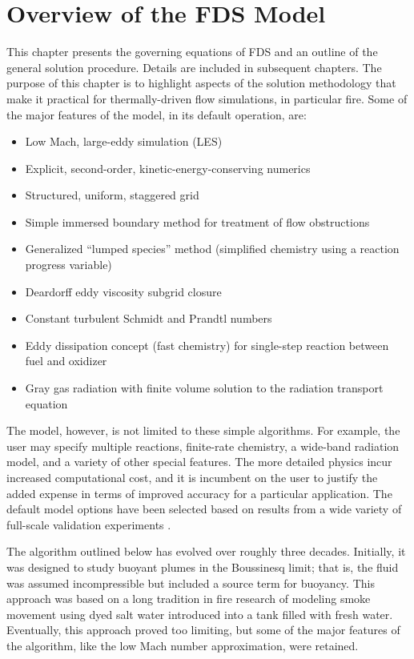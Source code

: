 
\chapter{Overview of the FDS Model}

\label{basisformodel}

This chapter presents the governing equations of FDS and an outline of the general solution procedure. Details are included in subsequent chapters. The purpose of this chapter is to highlight aspects of the solution methodology that make it practical for thermally-driven flow simulations, in particular fire. Some of the major features of the model, in its default operation, are:
\begin{itemize}
\item Low Mach, large-eddy simulation (LES)
\item Explicit, second-order, kinetic-energy-conserving numerics
\item Structured, uniform, staggered grid
\item Simple immersed boundary method for treatment of flow obstructions
\item Generalized ``lumped species'' method (simplified chemistry using a reaction progress variable)
\item Deardorff eddy viscosity subgrid closure
\item Constant turbulent Schmidt and Prandtl numbers
\item Eddy dissipation concept (fast chemistry) for single-step reaction between fuel and oxidizer
\item Gray gas radiation with finite volume solution to the radiation transport equation
\end{itemize}
The model, however, is not limited to these simple algorithms. For example, the user may specify multiple reactions, finite-rate chemistry, a wide-band radiation model, and a variety of other special features. The more detailed physics incur increased computational cost, and it is incumbent on the user to justify the added expense in terms of improved accuracy for a particular application.  The default model options have been selected based on results from a wide variety of full-scale validation experiments \cite{FDS_Validation_Guide}.

The algorithm outlined below has evolved over roughly three decades. Initially, it was designed to study buoyant plumes in the Boussinesq limit; that is, the fluid was assumed incompressible but included a source term for buoyancy. This approach was based on a long tradition in fire research of modeling smoke movement using dyed salt water introduced into a tank filled with fresh water. Eventually, this approach proved too limiting, but some of the major features of the algorithm, like the low Mach number approximation, were retained.

